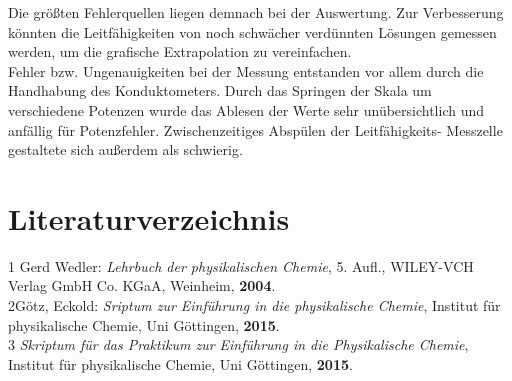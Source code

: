 \documentclass[12pt,a4paper,titlepage,headinclude,bibtotoc]{scrartcl}
\begin{document}
Die größten Fehlerquellen liegen demnach bei der Auswertung. Zur Verbesserung könnten die Leitfähigkeiten von noch schwächer verdünnten Lösungen gemessen werden, um die grafische Extrapolation zu vereinfachen.  \\

Fehler bzw. Ungenauigkeiten bei der Messung entstanden vor allem durch die Handhabung des Konduktometers. Durch das Springen der Skala um verschiedene Potenzen wurde das Ablesen der Werte sehr unübersichtlich und anfällig für Potenzfehler. Zwischenzeitiges Abspülen der Leitfähigkeits- Messzelle gestaltete sich außerdem als schwierig. \\


\newpage

\section{Literaturverzeichnis}
\begin{flushleft}
1 \quad Gerd Wedler: \emph{Lehrbuch der physikalischen Chemie}, 5. Aufl., WILEY-VCH Verlag GmbH Co. KGaA, Weinheim, \textbf{2004}.\\
\vspace{0,5 cm}
2\quad Götz, Eckold: \emph{Sriptum zur Einführung in die physikalische Chemie}, Institut für physikalische Chemie, Uni Göttingen, \textbf{2015}.\\
\vspace{0,5 cm}
3 \quad \emph{Skriptum für das Praktikum zur Einführung in die Physikalische Chemie}, Institut für physikalische Chemie, Uni Göttingen, \textbf{2015}.\\
\end{flushleft}
\end{document}
